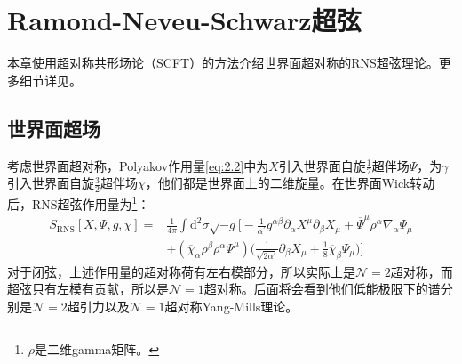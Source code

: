 \chapter{Ramond-Neveu-Schwarz超弦}
\label{chap:3}
本章使用超对称共形场论（SCFT）的方法介绍世界面超对称的RNS超弦理论。更多细节详见\cite{Green:2012oqa,Green:2012pqa}。
\section{世界面超场}
考虑世界面超对称，Polyakov作用量\ref{eq:2.2}中为$X$引入世界面自旋$\frac12$超伴场$\Psi$，为$\gamma$引入世界面自旋$\frac32$超伴场$\chi$，他们都是世界面上的二维旋量。在世界面Wick转动后，RNS超弦作用量为\footnote{$\rho$是二维gamma矩阵。}：
\begin{equation}
	\begin{aligned}
		S_{\mathrm{RNS}}[X,\Psi,g,\chi]=&\frac1{4\pi}\int\mathrm{d}^2\sigma\sqrt{-g}\Big[-\frac1{\alpha^{\prime}}g^{\alpha\beta}\partial_\alpha X^\mu\partial_\beta X_\mu+\overline{\Psi}^\mu\rho^\alpha\nabla_\alpha\Psi_\mu\\&+(\overline{\chi}_\alpha\rho^\beta\rho^\alpha\Psi^\mu)\Big(\frac1{\sqrt{2\alpha^{\prime}}}\partial_\beta X_\mu+\frac18\overline{\chi}_\beta\Psi_\mu\Big)\Big]
	\end{aligned}
\end{equation}
对于闭弦，上述作用量的超对称荷有左右模部分，所以实际上是$\mathcal{N}=2$超对称，而超弦只有左模有贡献，所以是$\mathcal{N}=1$超对称。后面将会看到他们低能极限下的谱分别是$\mathcal{N}=2$超引力以及$\mathcal{N}=1$超对称Yang-Mills理论。

